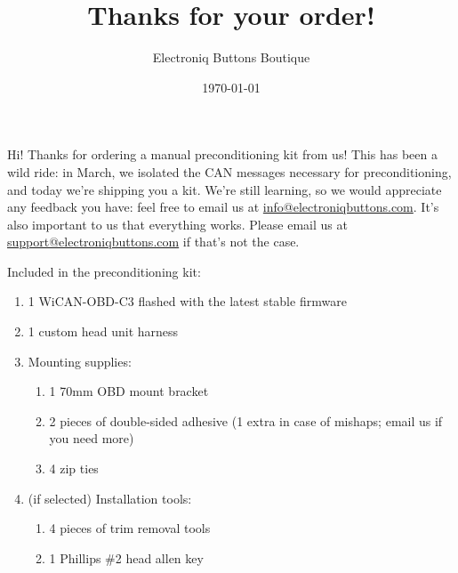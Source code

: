 \documentclass[superscriptaddress,onecolumn,floatfix]{revtex4-2}
\begin{document}
                            
\title{Thanks for your order!}
\author{Electroniq Buttons Boutique}
\date{\today}

\maketitle

Hi! Thanks for ordering a manual preconditioning kit from us! This has been a wild ride: in March, we isolated the CAN messages necessary for preconditioning, and today we're shipping you a kit. We're still learning, so we would appreciate any feedback you have: feel free to email us at \href{mailto:info@electroniqbuttons.com}{info@electroniqbuttons.com}. It's also important to us that everything works. Please email us at \href{mailto:support@electroniqbuttons.com}{support@electroniqbuttons.com} if that's not the case. 

Included in the preconditioning kit:
{\small
\begin{enumerate}
  \item 1 WiCAN-OBD-C3 flashed with the latest stable firmware
  \item 1 custom head unit harness
  \item Mounting supplies: 
    \begin{enumerate}
      \item 1 70mm OBD mount bracket
      \item 2 pieces of double-sided adhesive (1 extra in case of mishaps; email us if you need more)
      \item 4 zip ties
    \end{enumerate}
  \item (if selected) Installation tools:
    \begin{enumerate}
      \item 4 pieces of trim removal tools
      \item 1 Phillips \#2 head allen key
    \end{enumerate}
\end{enumerate}
}
\end{document}
